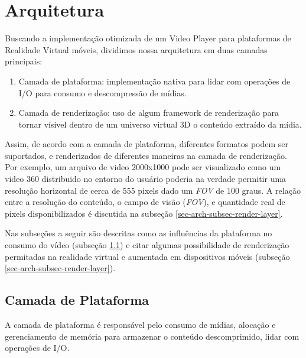 \section{Arquitetura} \label{sec-videoplayer-arch}


Buscando a implementação otimizada de um Video Player para plataformas de Realidade Virtual móveis, dividimos nossa arquitetura em duas camadas principais:

\begin{enumerate}
    \item Camada de plataforma: implementação nativa para lidar com operações de I/O para consumo e descompressão de mídias.
    \item Camada de renderização: uso de algum framework de renderização para tornar vísivel dentro de um universo virtual 3D o conteúdo extraído da mídia.
\end{enumerate}

Assim, de acordo com a camada de plataforma, diferentes formatos podem ser suportados, e renderizados de diferentes maneiras na camada de renderização. Por exemplo, um arquivo de video 2000x1000 pode ser visualizado como um video 360 distribuido no entorno do usuário poderia na verdade permitir uma resolução horizontal de cerca de 555 pixels dado um \textit{FOV} de 100 graus. A relação entre a resolução do conteúdo, o campo de visão (\textit{FOV}), e quantidade real de pixels disponibilizados é discutida na subseção \ref{sec-arch-subsec-render-layer}.

Nas subseções a seguir são descritas como as influências da plataforma no consumo do vídeo (subseção \ref{sec-arch-subsec-platform-layer}) e citar algumas possibilidade de renderização permitadas na realidade virtual e aumentada em dispositivos móveis (subseção \ref{sec-arch-subsec-render-layer}).

\subsection{Camada de Plataforma} \label{sec-arch-subsec-platform-layer}


A camada de plataforma é responsável pelo consumo de mídias, alocação e gerenciamento de memória para armazenar o conteúdo descomprimido, lidar com operações de I/O.

